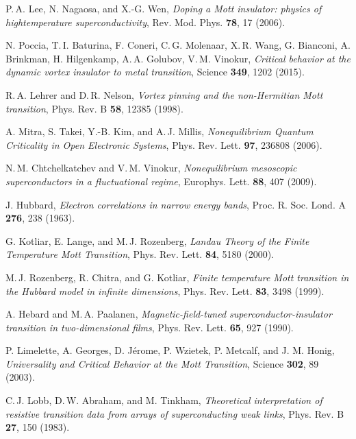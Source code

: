 \documentclass[aps,twocolumn,prl,10pt,amsmath,amssymb,nofootinbib,showpacs,superscriptaddress,floatfix]{revtex4-1}
\begin{document}
\begin{thebibliography}{10}
P.\,A. Lee, N. Nagaosa, and X.-G. Wen, \textit{Doping a Mott insulator: physics of hightemperature
superconductivity}, Rev. Mod. Phys. \textbf{78}, 17 (2006).

N. Poccia, T.\,I. Baturina, F. Coneri, C.\,G. Molenaar,
X.\,R. Wang, G. Bianconi, A. Brinkman, H. Hilgenkamp,
A.\,A. Golubov, V.\,M. Vinokur,
\textit{Critical behavior at the dynamic vortex insulator to metal transition},
Science \textbf{349}, 1202 (2015).

R.\,A. Lehrer and D.\,R. Nelson,
\textit{Vortex pinning and the non-Hermitian Mott transition},
Phys. Rev. B \textbf{58}, 12385 (1998).

A. Mitra, S. Takei, Y.-B. Kim, and A.\,J. Millis,
\textit{Nonequilibrium Quantum Criticality in Open Electronic Systems},
Phys. Rev. Lett. \textbf{97}, 236808 (2006).

N.\,M. Chtchelkatchev and V.\,M. Vinokur,
\textit{Nonequilibrium mesoscopic superconductors in a fluctuational regime}, 
Europhys. Lett. \textbf{88}, 407 (2009).

J. Hubbard,
\textit{Electron correlations in narrow energy bands}, 
Proc. R. Soc. Lond. A \textbf{276}, 238 (1963).

G. Kotliar, E. Lange, and M.\,J. Rozenberg,
\textit{Landau Theory of the Finite Temperature Mott Transition},
Phys. Rev. Lett. \textbf{84}, 5180 (2000).

M.\,J. Rozenberg, R. Chitra, and G. Kotliar,
\textit{Finite temperature Mott transition in the Hubbard model in infinite dimensions}, 
Phys. Rev. Lett. \textbf{83}, 3498 (1999).

A. Hebard and M.\,A. Paalanen,
\textit{Magnetic-field-tuned superconductor-insulator transition in two-dimensional films},
Phys. Rev. Lett. \textbf{65}, 927 (1990).

P. Limelette, A. Georges, D. J\'{e}rome, P. Wzietek,
P. Metcalf, and J. M. Honig,
\textit{Universality and Critical Behavior at the Mott Transition}, 
Science \textbf{302}, 89 (2003).

 C.\,J. Lobb, D.\,W. Abraham, and M. Tinkham,
\textit{Theoretical interpretation of resistive transition data from arrays of superconducting weak links},
Phys. Rev. B \textbf{27}, 150 (1983).


\end{thebibliography}
\end{document}
